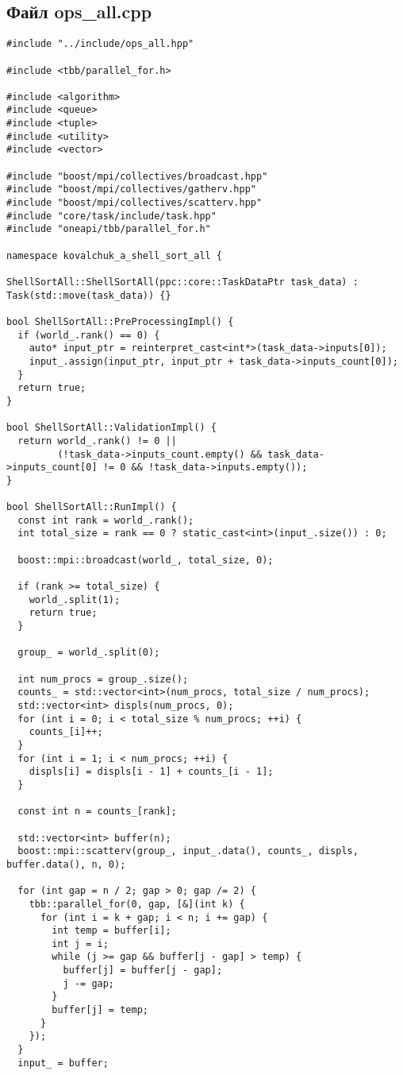 \documentclass[a4paper,12pt]{article}
\begin{document}
\subsection*{Файл ops\_all.cpp}
\begin{lstlisting}
#include "../include/ops_all.hpp"

#include <tbb/parallel_for.h>

#include <algorithm>
#include <queue>
#include <tuple>
#include <utility>
#include <vector>

#include "boost/mpi/collectives/broadcast.hpp"
#include "boost/mpi/collectives/gatherv.hpp"
#include "boost/mpi/collectives/scatterv.hpp"
#include "core/task/include/task.hpp"
#include "oneapi/tbb/parallel_for.h"

namespace kovalchuk_a_shell_sort_all {

ShellSortAll::ShellSortAll(ppc::core::TaskDataPtr task_data) : Task(std::move(task_data)) {}

bool ShellSortAll::PreProcessingImpl() {
  if (world_.rank() == 0) {
    auto* input_ptr = reinterpret_cast<int*>(task_data->inputs[0]);
    input_.assign(input_ptr, input_ptr + task_data->inputs_count[0]);
  }
  return true;
}

bool ShellSortAll::ValidationImpl() {
  return world_.rank() != 0 ||
         (!task_data->inputs_count.empty() && task_data->inputs_count[0] != 0 && !task_data->inputs.empty());
}

bool ShellSortAll::RunImpl() {
  const int rank = world_.rank();
  int total_size = rank == 0 ? static_cast<int>(input_.size()) : 0;

  boost::mpi::broadcast(world_, total_size, 0);

  if (rank >= total_size) {
    world_.split(1);
    return true;
  }

  group_ = world_.split(0);

  int num_procs = group_.size();
  counts_ = std::vector<int>(num_procs, total_size / num_procs);
  std::vector<int> displs(num_procs, 0);
  for (int i = 0; i < total_size % num_procs; ++i) {
    counts_[i]++;
  }
  for (int i = 1; i < num_procs; ++i) {
    displs[i] = displs[i - 1] + counts_[i - 1];
  }

  const int n = counts_[rank];

  std::vector<int> buffer(n);
  boost::mpi::scatterv(group_, input_.data(), counts_, displs, buffer.data(), n, 0);

  for (int gap = n / 2; gap > 0; gap /= 2) {
    tbb::parallel_for(0, gap, [&](int k) {
      for (int i = k + gap; i < n; i += gap) {
        int temp = buffer[i];
        int j = i;
        while (j >= gap && buffer[j - gap] > temp) {
          buffer[j] = buffer[j - gap];
          j -= gap;
        }
        buffer[j] = temp;
      }
    });
  }
  input_ = buffer;


\end{lstlisting}
\end{document}
